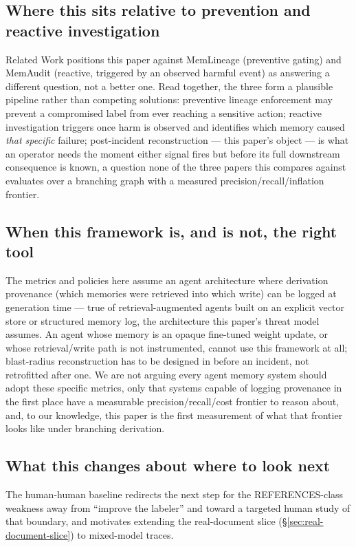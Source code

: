 \subsection{Where this sits relative to prevention and reactive investigation}

Related Work positions this paper against MemLineage (preventive
gating) and MemAudit (reactive, triggered by an observed harmful event)
as answering a different question, not a better one. Read together,
the three form a plausible pipeline rather than competing solutions:
preventive lineage enforcement may prevent a compromised label from
ever reaching a sensitive action; reactive investigation triggers once
harm is observed and identifies which memory caused \emph{that
specific} failure; post-incident reconstruction --- this paper's object
--- is what an operator needs the moment either signal fires but
before its full downstream consequence is known, a question none of
the three papers this compares against evaluates over a branching
graph with a measured precision/recall/inflation frontier.

\subsection{When this framework is, and is not, the right tool}

The metrics and policies here assume an agent architecture where
derivation provenance (which memories were retrieved into which write)
can be logged at generation time --- true of retrieval-augmented agents
built on an explicit vector store or structured memory log, the
architecture this paper's threat model assumes. An agent whose memory
is an opaque fine-tuned weight update, or whose retrieval/write path is
not instrumented, cannot use this framework at all; blast-radius
reconstruction has to be designed in before an incident, not
retrofitted after one. We are not arguing every agent memory system
should adopt these specific metrics, only that systems capable of
logging provenance in the first place have a measurable
precision/recall/cost frontier to reason about, and, to our knowledge,
this paper is the first measurement of what that frontier looks like
under branching derivation.

\subsection{What this changes about where to look next}

The human-human baseline redirects the next step for the
REFERENCES-class weakness away from ``improve the labeler'' and toward
a targeted human study of that boundary, and motivates extending the
real-document slice (\S\ref{sec:real-document-slice}) to mixed-model
traces.
